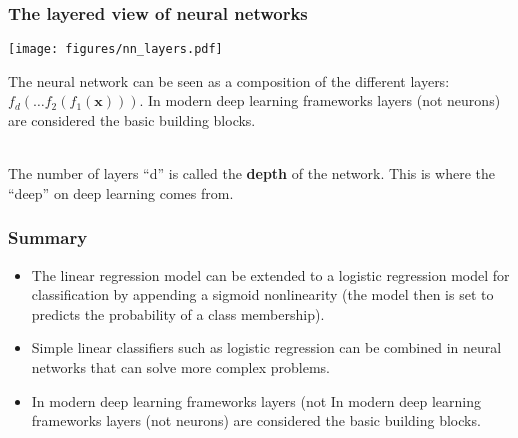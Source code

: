 \documentclass[notes]{beamer}          %
\begin{document}
\begin{frame}
\frametitle{The layered view of neural networks}
\begin{center}
\texttt{[image: figures/nn\_layers.pdf]} \\
\end{center}
The neural network can be seen as a composition of the different layers: $f_d(\ldots f_2(f_1(\mathbf{x})))$. In modern deep learning frameworks layers (not neurons) are considered the basic building blocks. \\~\


The number of layers ``d'' is called the \textbf{depth} of the network. This is where the ``deep'' on deep learning comes from.
\end{frame}


\begin{comment}

\begin{frame}
\frametitle{The layered view of neural networks}
\begin{center}
\texttt{[image: figures/nn\_layers\_training.pdf]} \\
\end{center}
Layered view of a neural network at training time.
\end{frame}

\end{comment}

\begin{frame}
\frametitle{Summary}
\begin{itemize}
    \item The linear regression model can be extended to a logistic regression model for classification by appending a sigmoid nonlinearity (the model then is set to predicts the probability of a class membership). 
    \item Simple linear classifiers such as logistic regression can be combined in neural networks that can solve more complex problems.
    \item In modern deep learning frameworks layers (not In modern deep learning frameworks layers (not neurons) are considered the basic building blocks.
\end{itemize}
\end{frame}
\end{document}
